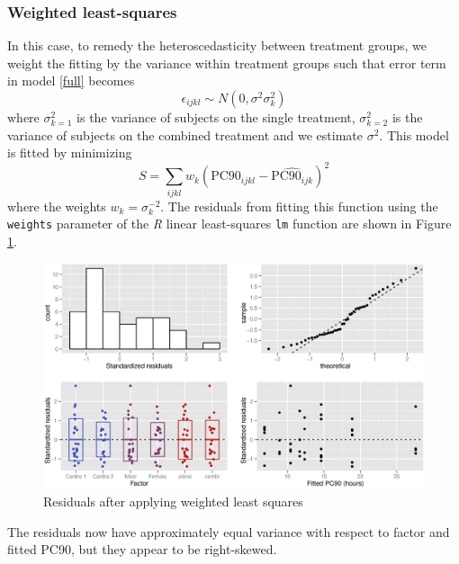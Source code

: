 \subsubsection*{Weighted least-squares}
In this case, to remedy the heteroscedasticity between treatment groups, we weight the fitting by the variance within treatment groups such that error term in model \ref{full} becomes 
\begin{equation}
\epsilon_{ijkl}\sim N(0,\sigma^2\sigma_{k}^{2})\label{wls}
\end{equation}
where $\sigma_{k=1}^{2}$ is the variance of subjects on the single treatment, $\sigma_{k=2}^{2}$ is the variance of subjects on the combined treatment and we estimate $\sigma^{2}$. This model is fitted by minimizing
\begin{equation*}
S=\sum_{ijkl} w_{k}(\mathrm{PC}90_{ijkl} - \widehat{\mathrm{PC}90_{ijk}})^{2}
\end{equation*}
where the weights $w_{k}=\sigma_{k}^{-2}$. The residuals from fitting this function using the \texttt{weights} parameter of the \emph{R} linear least-squares \texttt{lm} function are shown in Figure \ref{aovresw}.
\begin{figure}[h]
\includegraphics[width=150mm]{aovresw.eps} 
\caption{Residuals after applying weighted least squares}
\label{aovresw}
\end{figure}

The residuals now have approximately equal variance with respect to factor and fitted PC90, but they appear to be right-skewed.

